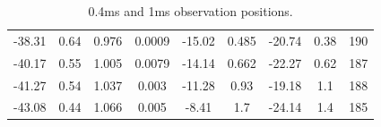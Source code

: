 \documentclass[useAMS,usenatbib]{mn2e}
\begin{document}
\begin{table}
\begin{tabular}{|c|c|c|c|c|c|c|c|c|}
-38.31                           & 0.64                               & 0.976              & 0.0009                             & -15.02  & 0.485                                    & -20.74   & 0.38  &190                                    \\

-40.17                           & 0.55                               & 1.005              & 0.0079                             & -14.14  & 0.662                                    & -22.27   & 0.62  &187                                   \\

-41.27                           & 0.54                               & 1.037              & 0.003                              & -11.28  & 0.93                                     & -19.18   & 1.1   &188                                   \\

-43.08                           & 0.44                               & 1.066              & 0.005                              & -8.41   & 1.7                                      & -24.14   & 1.4   &185   
                                  
\end{tabular}
\label{table:apex}
\caption{0.4ms and 1ms observation positions.}
\end{table}



\end{document}
